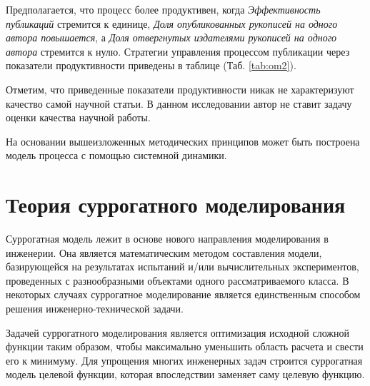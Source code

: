 Предполагается, что процесс более продуктивен, когда \textit{Эффективность публикаций} стремится к единице, \textit{Доля опубликованных рукописей на одного автора повышается}, а \textit{Доля отвергнутых издателями рукописей на одного автора} стремится к нулю.
Стратегии управления процессом публикации через показатели продуктивности приведены в таблице (Таб. \ref{tab:om2}).

\begin{table}[H]
\centering
\caption{Стратегии управления продуктивностью процесса публикаций через показатели продуктивности.}
\label{tab:om2}
\end{table}
Отметим, что приведенные показатели продуктивности никак не характеризуют качество самой научной статьи.
В данном исследовании автор не ставит задачу оценки качества научной работы.

На основании вышеизложенных методических принципов может быть построена модель процесса с помощью системной динамики. 

\section{Теория суррогатного моделирования}

Суррогатная модель лежит в основе нового направления моделирования в инженерии.
Она является математическим методом составления модели, базирующейся на результатах испытаний и/или вычислительных экспериментов, проведенных с разнообразными объектами одного рассматриваемого класса.
В некоторых случаях суррогатное моделирование является единственным способом решения инженерно-технической задачи.

Задачей суррогатного моделирования является оптимизация исходной сложной функции таким образом, чтобы максимально уменьшить область расчета и свести его к минимуму. 
Для упрощения многих инженерных задач строится суррогатная модель целевой функции, которая впоследствии заменяет саму целевую функцию.

